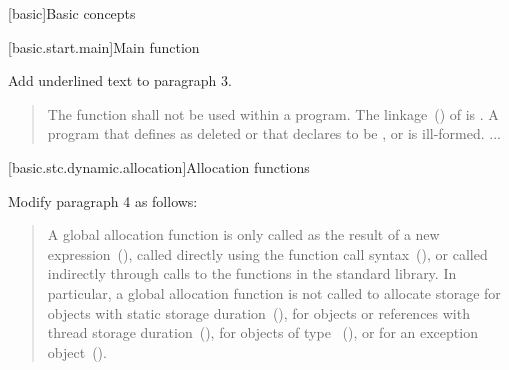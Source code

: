 
[basic]{Basic concepts}

\setcounter{section}{6}

[basic.start.main]{Main function}

Add underlined text to paragraph 3.

\begin{quote}
	\setcounter{Paras}{2}

\pnum
The function  shall not be used within
a program.
%
The linkage~() of  is
. A program that defines  as
deleted or that declares  to be
 , or  is ill-formed. 
 ...
\end{quote}

\setcounter{section}{7}
\setcounter{subsection}{4}
[basic.stc.dynamic.allocation]{Allocation functions}

Modify paragraph 4 as follows:

\begin{quote}
	\setcounter{Paras}{3}
\pnum

A global allocation function is only called as the result of a new
expression~(),  called directly using the function call
syntax~(), 
or called indirectly through calls to the
functions in the \Cpp standard library. \enternote In particular, a
global allocation function is not called to allocate storage for objects
with static storage duration~(), for objects or references
with thread storage duration~(), for objects of
type ~(), or for an
exception object~().
\exitnote
\end{quote}

